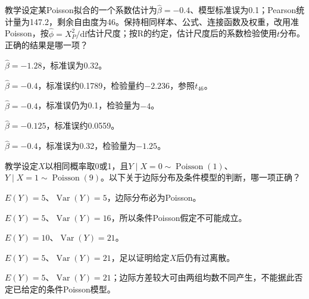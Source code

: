 \par\noindent\begin{minipage}{\linewidth}
教学设定某Poisson拟合的一个系数估计为$\widehat\beta=-0.4$、模型标准误为0.1；Pearson统计量为147.2，剩余自由度为46。保持相同样本、公式、连接函数及权重，改用准Poisson，按$\widehat\phi=X_P^2/\mathrm{df}$估计尺度；按R的约定，估计尺度后的系数检验使用$t$分布。正确的结果是哪一项？
\begin{choices}
\item $\widehat\beta=-1.28$，标准误为0.32。
\item $\widehat\beta=-0.4$，标准误约0.1789，检验量约$-2.236$，参照$t_{46}$。
\item $\widehat\beta=-0.4$，标准误仍为0.1，检验量为$-4$。
\item $\widehat\beta=-0.125$，标准误约0.0559。
\item $\widehat\beta=-0.4$，标准误为0.32，检验量为$-1.25$。
\end{choices}
\end{minipage}\par\medskip

\par\noindent\begin{minipage}{\linewidth}
教学设定$X$以相同概率取0或1，且$Y\mid X=0\sim\operatorname{Poisson}(1)$、$Y\mid X=1\sim\operatorname{Poisson}(9)$。以下关于边际分布及条件模型的判断，哪一项正确？
\begin{choices}
\item $E(Y)=5$、$\operatorname{Var}(Y)=5$，边际分布必为Poisson。
\item $E(Y)=5$、$\operatorname{Var}(Y)=16$，所以条件Poisson假定不可能成立。
\item $E(Y)=10$、$\operatorname{Var}(Y)=21$。
\item $E(Y)=5$、$\operatorname{Var}(Y)=21$，足以证明给定$X$后仍有过离散。
\item $E(Y)=5$、$\operatorname{Var}(Y)=21$；边际方差较大可由两组均数不同产生，不能据此否定已给定的条件Poisson模型。
\end{choices}
\end{minipage}\par\medskip

